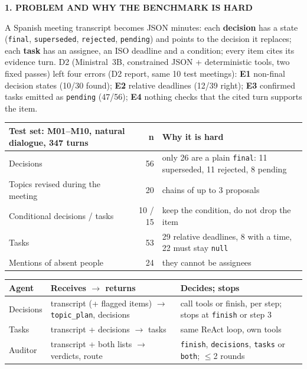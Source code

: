 \documentclass[10pt]{article}
\newcommand{\firstsectionbar}[1]{{\bfseries\sffamily\color{navy}#1}\par\vspace{1.4pt}}
\newcommand{\sectionbar}[1]{\vspace{3.6pt plus 1fill}{\bfseries\sffamily\color{navy}#1}\par\vspace{1.4pt}}
\newcommand{\tabfont}{\fontsize{7.1}{7.85}\selectfont}
\begin{document}
\begin{minipage}[t][\colheight][s]{0.492\textwidth}
\vspace{0pt}
\firstsectionbar{1. PROBLEM AND WHY THE BENCHMARK IS HARD}
A Spanish meeting transcript becomes JSON minutes: each \textbf{decision} has a state (\texttt{final}, \texttt{superseded}, \texttt{rejected}, \texttt{pending}) and points to the decision it replaces; each \textbf{task} has an assignee, an ISO deadline and a condition; every item cites its evidence turn. D2 (Ministral~3B, constrained JSON + deterministic tools, two fixed passes) left four errors (D2 report, same 10 test meetings): \textbf{E1} non-final decision states (10/30 found); \textbf{E2} relative deadlines (12/39 right); \textbf{E3} confirmed tasks emitted as \texttt{pending} (47/56); \textbf{E4} nothing checks that the cited turn supports the item.

\smallskip
{\tabfont
\begin{tabularx}{\linewidth}{@{}lrY@{}}
\toprule
Test set: M01--M10, natural dialogue, 347 turns & n & Why it is hard \\
\midrule
Decisions & 56 & only 26 are a plain \texttt{final}: 11 superseded, 11 rejected, 8 pending \\
Topics revised during the meeting & 20 & chains of up to 3 proposals \\
Conditional decisions / tasks & 10 / 15 & keep the condition, do not drop the item \\
Tasks & 53 & 29 relative deadlines, 8 with a time, 22 must stay \texttt{null} \\
Mentions of absent people & 24 & they cannot be assignees \\
\bottomrule
\end{tabularx}}

\sectionbar{2. AGENT DESIGN}
{\tabfont
\begin{tabularx}{\linewidth}{@{}l Y Y@{}}
\toprule
Agent & Receives $\to$ returns & Decides; stops \\
\midrule
Decisions & transcript (+ flagged items) $\to$ \texttt{topic\_plan}, decisions & call tools or finish, per step; stops at \texttt{finish} or step 3 \\
Tasks & transcript + decisions $\to$ tasks & same ReAct loop, own tools \\
Auditor & transcript + both lists $\to$ verdicts, route & \texttt{finish}, \texttt{decisions}, \texttt{tasks} or \texttt{both}; $\le$2 rounds \\
\bottomrule
\end{tabularx}}
\smallskip


\end{minipage}
\end{document}
